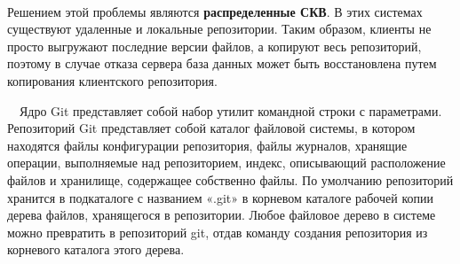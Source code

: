 \documentclass{article}
\begin{document}
~\

Решением этой проблемы являются \textbf{распределенные СКВ}. В этих системах существуют удаленные и локальные репозитории.
Таким образом, клиенты не просто выгружают последние версии файлов, а копируют весь репозиторий, поэтому в случае отказа сервера база данных может быть восстановлена путем копирования клиентского репозитория.

\begin{figure}[h]
\end{figure}

~\
Ядро Git представляет собой набор утилит командной строки с параметрами.
Репозиторий Git представляет собой каталог файловой системы, в котором находятся файлы конфигурации репозитория, файлы журналов, хранящие операции, выполняемые над репозиторием, индекс, описывающий расположение файлов и хранилище, содержащее собственно файлы. По умолчанию репозиторий хранится в подкаталоге с названием «.git» в корневом каталоге рабочей копии дерева файлов, хранящегося в репозитории. Любое файловое дерево в системе можно превратить в репозиторий git, отдав команду создания репозитория из корневого каталога этого дерева.
\end{document}
